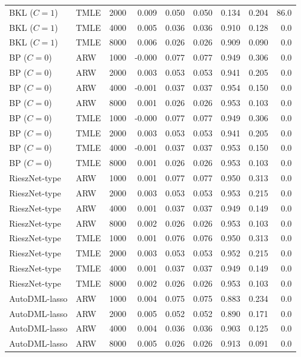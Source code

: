 \begin{tabular}{llrrrrrrr}
BKL ($C=1$) & TMLE & 2000 & 0.009 & 0.050 & 0.050 & 0.134 & 0.204 & 86.0 \\
BKL ($C=1$) & TMLE & 4000 & 0.005 & 0.036 & 0.036 & 0.910 & 0.128 & 0.0 \\
BKL ($C=1$) & TMLE & 8000 & 0.006 & 0.026 & 0.026 & 0.909 & 0.090 & 0.0 \\
BP ($C=0$) & ARW & 1000 & -0.000 & 0.077 & 0.077 & 0.949 & 0.306 & 0.0 \\
BP ($C=0$) & ARW & 2000 & 0.003 & 0.053 & 0.053 & 0.941 & 0.205 & 0.0 \\
BP ($C=0$) & ARW & 4000 & -0.001 & 0.037 & 0.037 & 0.954 & 0.150 & 0.0 \\
BP ($C=0$) & ARW & 8000 & 0.001 & 0.026 & 0.026 & 0.953 & 0.103 & 0.0 \\
BP ($C=0$) & TMLE & 1000 & -0.000 & 0.077 & 0.077 & 0.949 & 0.306 & 0.0 \\
BP ($C=0$) & TMLE & 2000 & 0.003 & 0.053 & 0.053 & 0.941 & 0.205 & 0.0 \\
BP ($C=0$) & TMLE & 4000 & -0.001 & 0.037 & 0.037 & 0.953 & 0.150 & 0.0 \\
BP ($C=0$) & TMLE & 8000 & 0.001 & 0.026 & 0.026 & 0.953 & 0.103 & 0.0 \\
RieszNet-type & ARW & 1000 & 0.001 & 0.077 & 0.077 & 0.950 & 0.313 & 0.0 \\
RieszNet-type & ARW & 2000 & 0.003 & 0.053 & 0.053 & 0.953 & 0.215 & 0.0 \\
RieszNet-type & ARW & 4000 & 0.001 & 0.037 & 0.037 & 0.949 & 0.149 & 0.0 \\
RieszNet-type & ARW & 8000 & 0.002 & 0.026 & 0.026 & 0.953 & 0.103 & 0.0 \\
RieszNet-type & TMLE & 1000 & 0.001 & 0.076 & 0.076 & 0.950 & 0.313 & 0.0 \\
RieszNet-type & TMLE & 2000 & 0.003 & 0.053 & 0.053 & 0.952 & 0.215 & 0.0 \\
RieszNet-type & TMLE & 4000 & 0.001 & 0.037 & 0.037 & 0.949 & 0.149 & 0.0 \\
RieszNet-type & TMLE & 8000 & 0.002 & 0.026 & 0.026 & 0.953 & 0.103 & 0.0 \\
AutoDML-lasso & ARW & 1000 & 0.004 & 0.075 & 0.075 & 0.883 & 0.234 & 0.0 \\
AutoDML-lasso & ARW & 2000 & 0.005 & 0.052 & 0.052 & 0.890 & 0.171 & 0.0 \\
AutoDML-lasso & ARW & 4000 & 0.004 & 0.036 & 0.036 & 0.903 & 0.125 & 0.0 \\
AutoDML-lasso & ARW & 8000 & 0.005 & 0.026 & 0.026 & 0.913 & 0.091 & 0.0 \\

\end{tabular}

